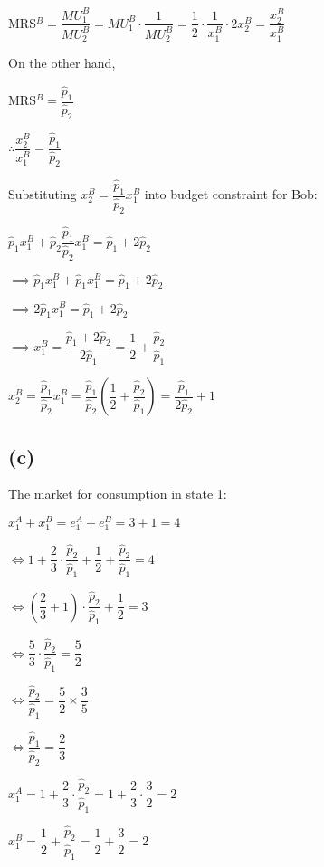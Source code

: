 \documentclass{article}
\begin{document}
MRS$^{B}=\dfrac{MU^{B}_{1}}{MU^{B}_{2}}=MU^{B}_{1}\cdot\dfrac{1}{MU^{B}_{2}}=\dfrac{1}{2}\cdot\dfrac{1}{x^{B}_{1}}\cdot2x^{B}_{2}=\dfrac{x^{B}_{2}}{x^{B}_{1}}$

On the other hand, 

MRS$^{B}=\dfrac{\hat{p}_{1}}{\hat{p}_{2}}$

$\therefore \dfrac{x^{B}_{2}}{x^{B}_{1}}=\dfrac{\hat{p}_{1}}{\hat{p}_{2}}$

Substituting $x^{B}_{2}=\dfrac{\hat{p}_{1}}{\hat{p}_{2}}x^{B}_{1}$ into budget constraint for Bob:

$\hat{p}_{1}x^{B}_{1}+\hat{p}_{2}\dfrac{\hat{p}_{1}}{\hat{p}_{2}}x^{B}_{1}=\hat{p}_{1}+2\hat{p}_{2}$

$\implies \hat{p}_{1}x^{B}_{1}+\hat{p}_{1}x^{B}_{1}=\hat{p}_{1}+2\hat{p}_{2}$

$\implies 2\hat{p}_{1}x^{B}_{1}=\hat{p}_{1}+2\hat{p}_{2}$

$\implies x^{B}_{1}=\dfrac{\hat{p}_{1}+2\hat{p}_{2}}{2\hat{p}_{1}}=\boxed{\dfrac{1}{2}+\dfrac{\hat{p}_{2}}{\hat{p}_{1}}}$

$x^{B}_{2}=\dfrac{\hat{p}_{1}}{\hat{p}_{2}}x^{B}_{1}=\dfrac{\hat{p}_{1}}{\hat{p}_{2}}\left(\dfrac{1}{2}+\dfrac{\hat{p}_{2}}{\hat{p}_{1}}\right)=\boxed{\dfrac{\hat{p}_{1}}{2\hat{p}_{2}}+1}$

\subsection*{(c)}

The market for consumption in state 1: 

$x^{A}_{1}+x^{B}_{1}=e^{A}_{1}+e^{B}_{1}=3+1=4$

$\iff 1+\dfrac{2}{3}\cdot\dfrac{\hat{p}_{2}}{\hat{p}_{1}}+\dfrac{1}{2}+\dfrac{\hat{p}_{2}}{\hat{p}_{1}}=4$

$\iff \left(\dfrac{2}{3}+1\right)\cdot\dfrac{\hat{p}_{2}}{\hat{p}_{1}}+\dfrac{1}{2}=3$

$\iff \dfrac{5}{3}\cdot\dfrac{\hat{p}_{2}}{\hat{p}_{1}}=\dfrac{5}{2}$

$\iff \dfrac{\hat{p}_{2}}{\hat{p}_{1}}=\dfrac{5}{2}\times\dfrac{3}{5}$

$\iff \boxed{\dfrac{\hat{p}_{1}}{\hat{p}_{2}}=\dfrac{2}{3}}$

$x^{A}_{1}=1+\dfrac{2}{3}\cdot\dfrac{\hat{p}_{2}}{\hat{p}_{1}}=1+\dfrac{2}{3}\cdot\dfrac{3}{2}=2$

$x^{B}_{1}=\dfrac{1}{2}+\dfrac{\hat{p}_{2}}{\hat{p}_{1}}=\dfrac{1}{2}+\dfrac{3}{2}=2$
\end{document}
